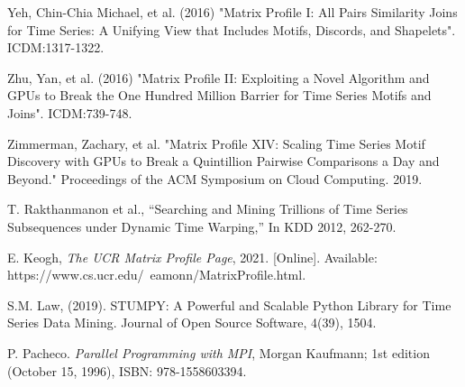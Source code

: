 \documentclass[conference]{IEEEtran}
\begin{document}


\begin{thebibliography}{7}  

 Yeh, Chin-Chia Michael, et al. (2016) "Matrix Profile I: All Pairs Similarity Joins for Time Series: A Unifying View that Includes Motifs, Discords, and Shapelets". ICDM:1317-1322.

 Zhu, Yan, et al. (2016) "Matrix Profile II: Exploiting a Novel Algorithm and GPUs to Break the One Hundred Million Barrier for Time Series Motifs and Joins". ICDM:739-748.

 Zimmerman, Zachary, et al. "Matrix Profile XIV: Scaling Time Series Motif Discovery with GPUs to Break a Quintillion Pairwise Comparisons a Day and Beyond." Proceedings of the ACM Symposium on Cloud Computing. 2019.

 T. Rakthanmanon et al., “Searching and Mining Trillions of Time Series Subsequences under Dynamic Time Warping,” In KDD 2012, 262-270.

 E. Keogh, \emph{The UCR Matrix Profile Page}, 2021. [Online]. Available: https://www.cs.ucr.edu/~eamonn/MatrixProfile.html.

 S.M. Law, (2019). STUMPY: A Powerful and Scalable Python Library for Time Series Data Mining. Journal of Open Source Software, 4(39), 1504.

 P. Pacheco. \emph{Parallel Programming with MPI}, Morgan Kaufmann; 1st edition (October 15, 1996), ISBN: 978-1558603394.

\end{thebibliography}
\end{document}
